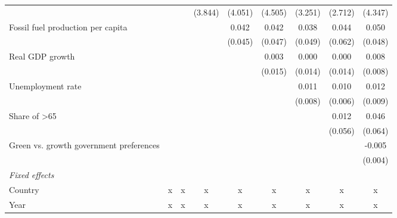 \begin{table}[htbp]
\begin{tabular}{lcccccccc}
                                              &                &               & (3.844)     & (4.051)     & (4.505) & (3.251)       & (2.712)       & (4.347)\\   
      Fossil fuel production per capita       &                &               &             & 0.042       & 0.042   & 0.038         & 0.044         & 0.050\\   
                                              &                &               &             & (0.045)     & (0.047) & (0.049)       & (0.062)       & (0.048)\\   
      Real GDP growth                         &                &               &             &             & 0.003   & 0.000         & 0.000         & 0.008\\   
                                              &                &               &             &             & (0.015) & (0.014)       & (0.014)       & (0.008)\\   
      Unemployment rate                       &                &               &             &             &         & 0.011         & 0.010         & 0.012\\   
                                              &                &               &             &             &         & (0.008)       & (0.006)       & (0.009)\\   
      Share of >65                            &                &               &             &             &         &               & 0.012         & 0.046\\   
                                              &                &               &             &             &         &               & (0.056)       & (0.064)\\   
      Green vs. growth government preferences &                &               &             &             &         &               &               & -0.005\\   
                                              &                &               &             &             &         &               &               & (0.004)\\   
      \emph{Fixed effects}\\
      Country                                 & x              & x             & x           & x           & x       & x             & x             & x\\  
      Year                                    & x              & x             & x           & x           & x       & x             & x             & x\\  

\end{tabular}
\end{table}
